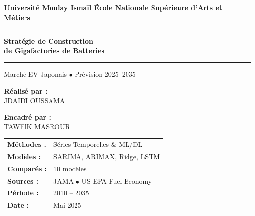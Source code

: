 \documentclass[12pt,a4paper]{article}
\begin{document}
\begin{titlepage}
  \centering
  \vspace*{1cm}

  {\Large\bfseries Université Moulay Ismaïl \hfill École Nationale Supérieure d'Arts et Métiers}

  \vspace{1.5cm}
  \rule{\textwidth}{2pt}
  \vspace{0.4cm}

  {\Huge\bfseries Stratégie de Construction\\[0.3em]
  de Gigafactories de Batteries}

  \vspace{0.4cm}
  \rule{\textwidth}{2pt}

  \vspace{0.5cm}
  {\large Marché EV Japonais $\bullet$ Prévision 2025--2035}

  \vspace{2cm}
  \begin{minipage}{0.45\textwidth}
    \centering
    \textbf{Réalisé par :}\\[0.3em]
    {\Large JDAIDI OUSSAMA}
  \end{minipage}
  \hfill
  \begin{minipage}{0.45\textwidth}
    \centering
    \textbf{Encadré par :}\\[0.3em]
    {\Large TAWFIK MASROUR}
  \end{minipage}

  \vspace{2.5cm}
  \begin{tabular}{ll}
    \textbf{Méthodes :}  & Séries Temporelles \& ML/DL \\
    \textbf{Modèles :}   & SARIMA, ARIMAX, Ridge, LSTM \\
    \textbf{Comparés :}  & 10 modèles \\[0.6em]
    \textbf{Sources :}   & JAMA $\bullet$ US EPA Fuel Economy \\
    \textbf{Période :}   & 2010 -- 2035 \\
    \textbf{Date :}      & Mai 2025 \\
  \end{tabular}
\end{titlepage}

\tableofcontents
\newpage

\end{document}
